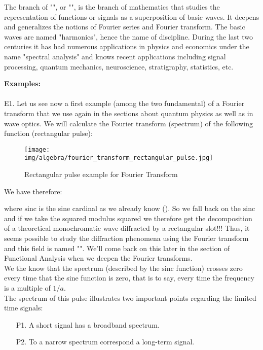 	\begin{tcolorbox}[title=Remark,colframe=black,arc=10pt]
	The branch of "", or "", is the branch of mathematics that studies the representation of functions or signals as a superposition of basic waves. It deepens and generalizes the notions of Fourier series and Fourier transform. The basic waves are named "harmonics", hence the name of discipline. During the last two centuries it has had numerous applications in physics and economics under the name "spectral analysis" and knows recent applications including signal processing, quantum mechanics, neuroscience, stratigraphy, statistics, etc.
	\end{tcolorbox}
	\begin{tcolorbox}[colframe=black,colback=white,sharp corners]
	\textbf{{\Large {}}Examples:}\\\\
	E1. Let us see now a first example (among the two fundamental) of a Fourier transform that we use again in the sections about quantum physics as well as in wave optics. We will calculate the Fourier transform (spectrum) of the following function (rectangular pulse):
	\begin{figure}[H]
		\centering
		\texttt{[image: img/algebra/fourier\_transform\_rectangular\_pulse.jpg]}
		\caption[]{Rectangular pulse example for Fourier Transform}
	\end{figure}
	We have therefore:
	
	where $\text{sinc}$ is the sine cardinal as we already know (). So we fall back on the $\text{sinc}$ and if we take the squared modulus squared we therefore get the decomposition of a theoretical monochromatic wave diffracted by a rectangular slot!!! Thus, it seems possible to study the diffraction phenomena using the Fourier transform and this field is named "". We'll come back on this later in the section of Functional Analysis when we deepen the Fourier transforms.\\
	
	We the know that the spectrum (described by the $\text{sinc}$ function) crosses zero every time that the sine function is zero, that is to say, every time the frequency is a multiple of $1 / a$.\\
	
	The spectrum of this pulse illustrates two important points regarding the limited time signals:
	\begin{enumerate}
		\item[P1.] A short signal has a broadband spectrum.
		\item[P2.] To a narrow spectrum correspond a long-term signal.
	\end{enumerate}
	\end{tcolorbox}


